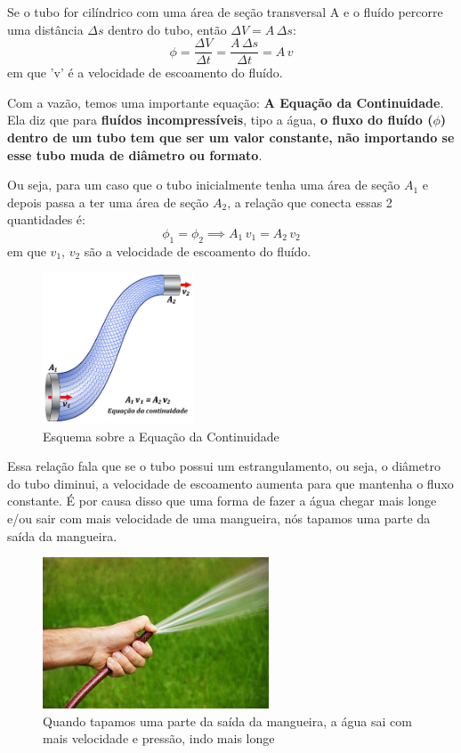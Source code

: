 \documentclass[12pt]{extarticle}
\newcommand{\<}{\langle}
\renewcommand{\>}{\rangle}
\theoremstyle{definition}
\begin{document}
Se o tubo for cilíndrico com uma área de seção transversal A e o fluído percorre uma distância $\Delta s$ dentro do tubo, então $\Delta V = A\,\Delta s$:
\begin{equation}
    \phi = \frac{\Delta V}{\Delta t} = \frac{A\,\Delta s}{\Delta t} = A\,v
\end{equation}
\noindent em que 'v' é a velocidade de escoamento do fluído.

Com a vazão, temos uma importante equação: \textbf{A Equação da Continuidade}. Ela diz que para \textbf{fluídos incompressíveis}, tipo a água, \textbf{o fluxo do fluído ($\phi$) dentro de um tubo tem que ser um valor constante, não importando se esse tubo muda de diâmetro ou formato}. 

Ou seja, para um caso que o tubo inicialmente tenha uma área de seção $A_1$ e depois passa a ter uma área de seção $A_2$, a relação que conecta essas 2 quantidades é:
\begin{equation}
    \phi_1=\phi_2 \implies A_1\,v_1 = A_2\,v_2
\end{equation}
\noindent em que $v_1,\,v_2$ são a velocidade de escoamento do fluído.
\begin{figure}[H]
    \centering
    \includegraphics[width=0.4\textwidth]{equacao-continuidade.jpg}
    \caption{Esquema sobre a Equação da Continuidade}
    \label{fig:eq_continuidade}
\end{figure}

Essa relação fala que se o tubo possui um estrangulamento, ou seja, o diâmetro do tubo diminui, a velocidade de escoamento aumenta para que mantenha o fluxo constante. É por causa disso que uma forma de fazer a água chegar mais longe e/ou sair com mais velocidade de uma mangueira, nós tapamos uma parte da saída da mangueira.
\begin{figure}[H]
    \centering
    \includegraphics[width=0.6\textwidth]{pressao-agua.jpeg}
    \caption{Quando tapamos uma parte da saída da mangueira, a água sai com mais velocidade e pressão, indo mais longe}
    \label{fig:eq_continuidade}
\end{figure}
\end{document}
